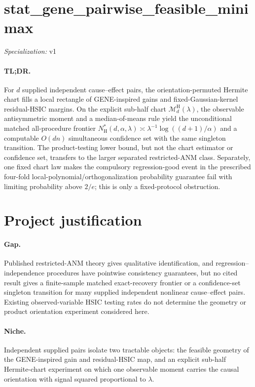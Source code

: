 \documentclass{article}
\begin{document}
\sloppy

\section*{stat\_\allowbreak{}gene\_\allowbreak{}pairwise\_\allowbreak{}feasible\_\allowbreak{}minimax}

\noindent\textit{Specialization:} v1\par

\paragraph{TL;DR.} For \(d\) supplied independent cause--effect pairs, the orientation-permuted Hermite chart fills a local rectangle of GENE-inspired gains and fixed-Gaussian-kernel residual-HSIC margins. On the explicit sub-half chart \(\mathcal M_d^{\mathrm H}(\lambda)\), the observable antisymmetric moment and a median-of-means rule yield the unconditional matched all-procedure frontier \(N_{\mathrm H}^*(d,\alpha,\lambda)\asymp\lambda^{-1}\log((d+1)/\alpha)\) and a computable \(O(dn)\) simultaneous confidence set with the same singleton transition. The product-testing lower bound, but not the chart estimator or confidence set, transfers to the larger separated restricted-ANM class. Separately, one fixed chart law makes the compulsory regression-good event in the prescribed four-fold local-polynomial/orthogonalization probability guarantee fail with limiting probability above \(2/e\); this is only a fixed-protocol obstruction.

\section{Project justification}

\paragraph{Gap.} Published restricted-ANM theory gives qualitative identification, and regression--independence procedures have pointwise consistency guarantees, but no cited result gives a finite-sample matched exact-recovery frontier or a confidence-set singleton transition for many supplied independent nonlinear cause--effect pairs. Existing observed-variable HSIC testing rates do not determine the geometry or product orientation experiment considered here.

\paragraph{Niche.} Independent supplied pairs isolate two tractable objects: the feasible geometry of the GENE-inspired gain and residual-HSIC map, and an explicit sub-half Hermite-chart experiment on which one observable moment carries the causal orientation with signal squared proportional to \(\lambda\).
\end{document}
